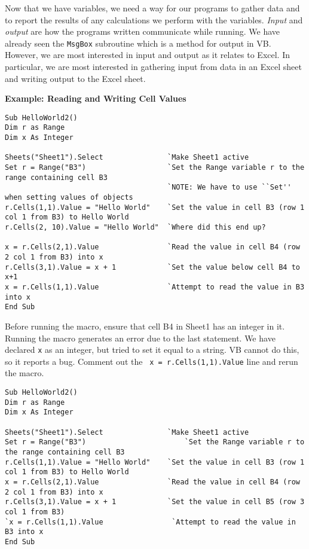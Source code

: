 \documentclass[10pt]{article}
\begin{document}
Now that we have variables, we need a way for our programs to gather
data and to report the results of any calculations we perform with the
variables. {\it Input} and {\it output} are how the programs written
communicate while running. We have already seen the {\tt MsgBox}
subroutine which is a method for output in VB. However, we are most
interested in input and output as it relates to Excel. In particular,
we are most interested in gathering input from data in an Excel sheet
and writing output to the Excel sheet. 


\bigskip \noindent
\textbf{Example:  Reading and Writing Cell Values}

\begin{verbatim}
Sub HelloWorld2()
Dim r as Range
Dim x As Integer

Sheets("Sheet1").Select               `Make Sheet1 active
Set r = Range("B3")                   `Set the Range variable r to the range containing cell B3
                                      `NOTE: We have to use ``Set'' when setting values of objects
r.Cells(1,1).Value = "Hello World"    `Set the value in cell B3 (row 1 col 1 from B3) to Hello World
r.Cells(2, 10).Value = "Hello World"  `Where did this end up? 

x = r.Cells(2,1).Value                `Read the value in cell B4 (row 2 col 1 from B3) into x
r.Cells(3,1).Value = x + 1            `Set the value below cell B4 to x+1
x = r.Cells(1,1).Value                `Attempt to read the value in B3 into x
End Sub
\end{verbatim}
Before running the macro, ensure that cell B4 in Sheet1 has an integer in it.
Running the macro generates an error due to the last statement. We
have declared {\tt x} as an integer, but tried to set it equal to a
string. VB cannot do this, so it reports a bug.  Comment out the {\tt
  x = r.Cells(1,1).Value} line and rerun the macro. 



\begin{verbatim}
Sub HelloWorld2()
Dim r as Range
Dim x As Integer

Sheets("Sheet1").Select               `Make Sheet1 active
Set r = Range("B3")                       `Set the Range variable r to the range containing cell B3
r.Cells(1,1).Value = "Hello World"    `Set the value in cell B3 (row 1 col 1 from B3) to Hello World
x = r.Cells(2,1).Value                `Read the value in cell B4 (row 2 col 1 from B3) into x
r.Cells(3,1).Value = x + 1            `Set the value in cell B5 (row 3 col 1 from B3)
`x = r.Cells(1,1).Value                `Attempt to read the value in B3 into x
End Sub
\end{verbatim}
\end{document}
